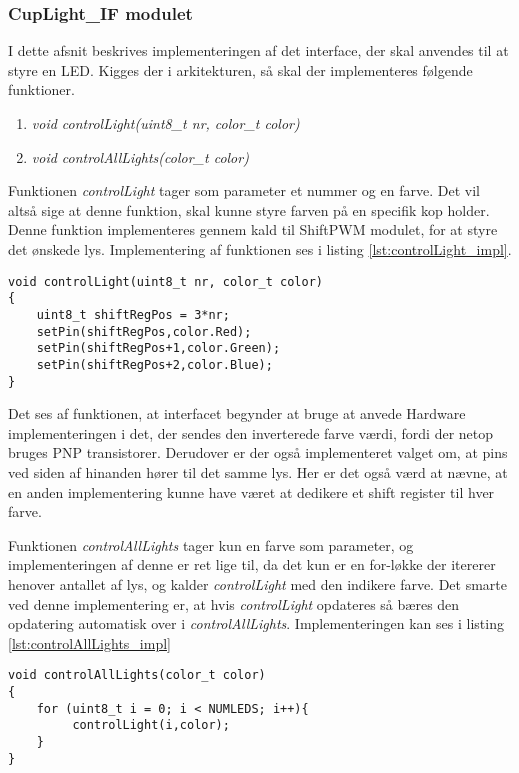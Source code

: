 \documentclass[Softwaredesign/Softwaredesign_main.tex]{subfiles}
\begin{document}
\subsubsection{CupLight\_IF modulet}
I dette afsnit beskrives implementeringen af det interface, der skal anvendes til at styre en LED. Kigges der i arkitekturen, så skal der implementeres følgende funktioner.
\begin{enumerate}
    \item \textit{void controlLight(uint8\_t nr, color\_t color)}
    \item \textit{void controlAllLights(color\_t color)}
\end{enumerate}

Funktionen \textit{controlLight} tager som parameter et nummer og en farve. Det vil altså sige at denne funktion, skal kunne styre farven på en specifik kop holder. Denne funktion implementeres gennem kald til ShiftPWM modulet, for at styre det ønskede lys. Implementering af funktionen ses i listing \ref{lst:controlLight_impl}.

\begin{lstlisting}[caption={Implementeringen af controlLight}, label={lst:controlLight_impl}]
void controlLight(uint8_t nr, color_t color)
{
    uint8_t shiftRegPos = 3*nr;
    setPin(shiftRegPos,color.Red);
    setPin(shiftRegPos+1,color.Green);
    setPin(shiftRegPos+2,color.Blue);
}
\end{lstlisting}

Det ses af funktionen, at interfacet begynder at bruge at anvede Hardware implementeringen i det, der sendes den inverterede farve værdi, fordi der netop bruges PNP transistorer. Derudover er der også implementeret valget om, at pins ved siden af hinanden hører til det samme lys. Her er det også værd at nævne, at en anden implementering kunne have været at dedikere et shift register til hver farve.

Funktionen \textit{controlAllLights} tager kun en farve som parameter, og implementeringen af denne er ret lige til, da det kun er en for-løkke der itererer henover antallet af lys, og kalder \textit{controlLight} med den indikere farve. Det smarte ved denne implementering er, at hvis \textit{controlLight} opdateres så bæres den opdatering automatisk over i \textit{controlAllLights}.  Implementeringen kan ses i listing \ref{lst:controlAllLights_impl}

\begin{lstlisting}[caption={Implementeringen af controlAllLights}, label={lst:controlAllLights_impl}]
void controlAllLights(color_t color)
{
    for (uint8_t i = 0; i < NUMLEDS; i++){
         controlLight(i,color);
    }
}
\end{lstlisting}
\end{document}
